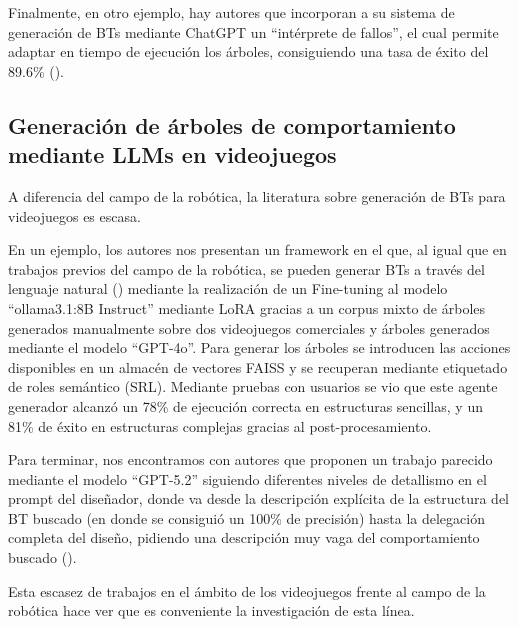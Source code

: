 Finalmente, en otro ejemplo, hay autores que incorporan a su sistema de generación de BTs mediante ChatGPT un ``intérprete de fallos'', el cual permite adaptar en tiempo de ejecución los árboles, consiguiendo una tasa de éxito del 89.6\% (\cite{BTRob3}).

\subsection{Generación de árboles de comportamiento mediante LLMs en videojuegos}

A diferencia del campo de la robótica, la literatura sobre generación de BTs para videojuegos es escasa.

En un ejemplo, los autores nos presentan un framework en el que, al igual que en trabajos previos del campo de la robótica, se pueden generar BTs a través del lenguaje natural (\cite{BTJuegos1}) mediante la realización de un Fine-tuning al modelo ``ollama3.1:8B Instruct'' mediante LoRA gracias a un corpus mixto de árboles generados manualmente sobre dos videojuegos comerciales y árboles generados mediante el modelo ``GPT-4o''.
Para generar los árboles se introducen las acciones disponibles en un almacén de vectores FAISS y se recuperan mediante etiquetado de roles semántico (SRL).
Mediante pruebas con usuarios se vio que este agente generador alcanzó un 78\% de ejecución correcta en estructuras sencillas, y un 81\% de éxito en estructuras complejas gracias al post-procesamiento.

Para terminar, nos encontramos con autores que proponen un trabajo parecido mediante el modelo ``GPT-5.2'' siguiendo diferentes niveles de detallismo en el prompt del diseñador, donde va desde la descripción explícita de la estructura del BT buscado (en donde se consiguió un 100\% de precisión) hasta la delegación completa del diseño, pidiendo una descripción muy vaga del comportamiento buscado (\cite{BTJuegos2}).

Esta escasez de trabajos en el ámbito de los videojuegos frente al campo de la robótica hace ver que es conveniente la investigación de esta línea.